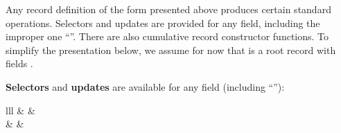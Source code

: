 \begin{isabellebody}
\begin{isamarkuptext}
\begin{description}
  \end{description}%
\end{isamarkuptext}%
\isamarkuptrue%
%
\isamarkuptrue%
%
\begin{isamarkuptext}%
Any record definition of the form presented above produces certain
  standard operations.  Selectors and updates are provided for any
  field, including the improper one ``''.  There are also
  cumulative record constructor functions.  To simplify the
  presentation below, we assume for now that  is a root record with fields .

  \medskip \textbf{Selectors} and \textbf{updates} are available for
  any field (including ``''):

  \begin{matharray}{lll}
     & \isa{{\isachardoublequote}{\isacharcolon}{\isacharcolon}{\isachardoublequote}} &  \\
     & \isa{{\isachardoublequote}{\isacharcolon}{\isacharcolon}{\isachardoublequote}} &  \\
  \end{matharray}


\end{isamarkuptext}
\end{isabellebody}

